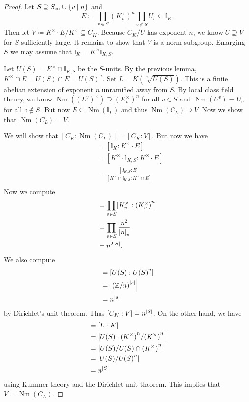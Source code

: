 \documentclass[leqno, openany]{memoir}
\theoremstyle{definition}
\theoremstyle{remark}
\theoremstyle{plain}
\theoremstyle{definition}
\theoremstyle{remark}
\newcommand{\Z}{\mathbb{Z}}
\newcommand{\I}{\mathbb{I}}
\DeclareMathOperator{\Nm}{Nm}
\begin{document}
\begin{proof} Let $S \supseteq S_{\infty} \cup \qty{v \mid n}$ and \[ E
\coloneqq \prod_{v \in S} {(K_v^{\times})}^n \prod_{v \notin S} U_v \subseteq
\I_K. \] Then let $V \coloneqq K^{\times} \cdot E / K^{\times} \subseteq C_K$.
Because $C_K/U$ has exponent $n$, we know $U \supseteq V$ for $S$ sufficiently
large. It remains to show that $V$ is a norm subgroup. Enlarging $S$ we may
assume that $\I_K = K^{\times} \I_{K,S}$.

    Let $U(S) = K^{\times} \cap \I_{K,S}$ be the $S$-units. By the previous
    lemma, $K^{\times} \cap E = U(S) \cap E = {U(S)}^n$. Set $L =
    K(\sqrt[n]{U(S)})$. This is a finite abelian extension of exponent $n$
    unramified away from $S$. By local class field theory, we know
    $\Nm({(L^v)}^{\times}) \supseteq {(K_v^{\times})}^n$ for all $s \in S$ and
    $\Nm(U^v) = U_v$ for all $v \notin S$. But now $E \subseteq \Nm(\I_L)$ and
    thus $\Nm(C_L) \supseteq V$. Now we show that $\Nm(C_L) = V$.

    We will show that $[C_K : \Nm(C_L)] = [C_K : V]$. But now we have
    \begin{align*} [C_K:V] &= [\I_K : K^{\times} \cdot E] \\ &= [K^{\times}
        \cdot \I_{K,S} : K^{\times} \cdot E] \\ &= \frac{[I_{K,S} :
        E]}{[K^{\times} \cap \I_{K,S} : K^{\times} \cap E]} \\ \end{align*} Now
        we compute \begin{align*} [\I_{K,S} : E] &= \prod_{v \in S}
            [K_v^{\times} : {(K_v^{\times})}^n] \\ &= \prod_{v \in S}
            \frac{n^2}{\abs{n}_v} \\ &= n^{2 \abs{S}}.  \end{align*} We also
            compute \begin{align*} [K^{\times} \cap \I_{K,S} : K^{\times} \cap
            E] &= [U(S) : {U(S)}^n] \\ &= \abs{{(\Z/n)}^{\abs{s}}} \\ &=
        n^{\abs{s}} \end{align*} by Dirichlet's unit theorem. Thus $[C_K : V] =
        n^{\abs{S}}$. On the other hand, we have \begin{align*} [C_K :
            \Nm(C_L)] &= [L:K] \\ &= \abs{ U(S) \cdot {(K^{\times})}^n /
            {(K^{\times})}^n } \\ &= \abs{U(S) / U(S) \cap {(K^{\times})}^n} \\
                                  &= \abs{U(S) / {U(S)}^n} \\ &= n^{\abs{S}}
        \end{align*} using Kummer theory and the Dirichlet unit theorem. This
    implies that $V = \Nm(C_L)$.  \end{proof}
\end{document}
